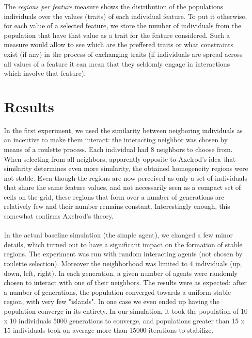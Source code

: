 \documentclass[twoside, 11pt, a4paper]{article}
\begin{document}
The \emph{regions per feature} measure shows the distribution of the populations individuals over the values (traits) of each individual feature. To put it otherwise, for each value of a selected feature, we store the number of individuals from the population that have that value as a trait for the feature considered.
Such a measure would allow to see which are the preffered traits or what constraints exist (if any) in the process of exchanging traits (if individuals are spread across all values of a feature it can mean that they seldomly engage in interactions which involve that feature).

\section{Results}

\paragraph*{}In the first experiment, we used the similarity between neigboring individuals as an incentive to make them interact: the interacting neighbor was chosen by means of a roulette process. Each individual had 8 neighbors to choose from. When selecting from all neighbors, apparently opposite to Axelrod's idea that similarity determines even more similarity, the obtained homogeneity regions were not stable. Even though the regions are now perceived as only a set of individuals that share the same feature values, and not necessarily seen as a compact set of cells on the grid, these regions that form over a number of generations are relatively few and their number remains constant. Interestingly enough, this somewhat confirms Axelrod's theory.

\paragraph*{}In the actual baseline simulation (the simple agent), we changed a few minor details, which turned out to have a significant impact on the formation of stable regions. The experiment was run with random interacting agents (not chosen by roulette selection). Moreover the neighborhood was limited to 4 individuals (up, down, left, right). In each generation, a given number of agents were randomly chosen to interact with one of their neighbors. The results were as expected: after a number of generations, the population converged towards a uniform stable region, with very few "islands". In one case we even ended up having the population converge in its entirety. In our simulation, it took the population of 10 x 10 individuals 5000 generations to converge, and populations greater than 15 x 15 individuals took on average more than 15000 iterations to stabilize.
\end{document}
